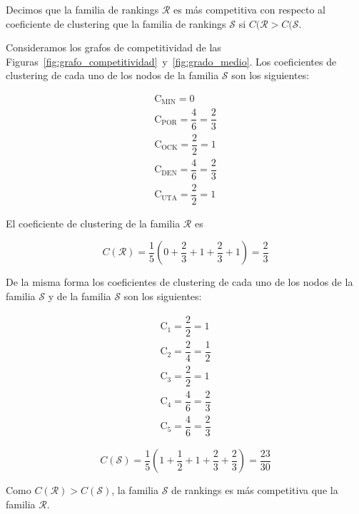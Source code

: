 \begin{defi}
Decimos que la familia de rankings $\mathcal{R}$ es más competitiva con respecto al coeficiente de clustering que la familia de rankings $\mathcal{S}$ si $C(\mathcal{R} > C(\mathcal{S}$.
\end{defi}

\begin{ejemplo}
Consideramos los grafos de competitividad de las Figuras~\ref{fig:grafo_competitividad}~y~\ref{fig:grado_medio}. Los coeficientes de clustering de cada uno de los nodos de la familia $\mathcal{S}$ son los siguientes:

\begin{eqnarray*}
\mathrm{C}_\text{MIN} =  0\\
\mathrm{C}_\text{POR} = \dfrac{4}{6} = \dfrac{2}{3}\\
\mathrm{C}_\text{OCK} = \dfrac{2}{2} = 1\\
\mathrm{C}_\text{DEN} = \dfrac{4}{6} = \dfrac{2}{3}\\
\mathrm{C}_\text{UTA} = \dfrac{2}{2} = 1
\end{eqnarray*}

El coeficiente de clustering de la familia $\mathcal{R}$ es 

\begin{equation*}
C(\mathcal{R}) = \dfrac{1}{5}\left( 0 + \dfrac{2}{3} + 1 + \dfrac{2}{3} + 1 \right) = \dfrac{2}{3}
\end{equation*}

De la misma forma los coeficientes de clustering de cada uno de los nodos de la familia $\mathcal{S}$ y de la familia $\mathcal{S}$ son los siguientes:

\begin{eqnarray*}
\mathrm{C}_\text{1} = \dfrac{2}{2} = 1\\
\mathrm{C}_\text{2} = \dfrac{2}{4} = \dfrac{1}{2}\\
\mathrm{C}_\text{3} = \dfrac{2}{2} = 1\\
\mathrm{C}_\text{4} = \dfrac{4}{6} = \dfrac{2}{3}\\
\mathrm{C}_\text{5} = \dfrac{4}{6} = \dfrac{2}{3}
\end{eqnarray*}

\begin{equation*}
C(\mathcal{S}) = \dfrac{1}{5}\left( 1 + \dfrac{1}{2} + 1 + \dfrac{2}{3} + \dfrac{2}{3} \right) = \dfrac{23}{30}
\end{equation*}

Como $C(\mathcal{R}) > C(\mathcal{S})$, la familia $\mathcal{S}$ de rankings es más competitiva que la familia $\mathcal{R}$.
 
\end{ejemplo}

